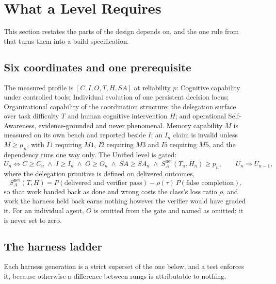 \documentclass[11pt]{article}
\theoremstyle{definition}
\begin{document}
\section{What a Level Requires}\label{sec:requires}

This section restates the parts of \citet{yang2026unified} the design depends on, and the one rule from \citet{yang2026designing} that turns them into a build specification.

\subsection{Six coordinates and one prerequisite}

The measured profile is $[C,I,O,T,H,SA]$ at reliability $p$: Cognitive capability under controlled tools; Individual evolution of one persistent decision locus; Organizational capability of the coordination structure; the delegation surface over task difficulty $T$ and human cognitive intervention $H$; and operational Self-Awareness, evidence-grounded and never phenomenal. Memory capability $M$ is measured on its own bench and reported beside $I$: an $I_n$ claim is invalid unless $M \ge \mu_n$, with $I1$ requiring $M1$, $I2$ requiring $M3$ and $I5$ requiring $M5$, and the dependency runs one way only. The Unified level is gated:
\[
U_n \iff C \ge C_n \;\wedge\; I \ge I_n \;\wedge\; O \ge O_n \;\wedge\; SA \ge SA_n \;\wedge\; S^{\text{net}}_A(T_n,H_n) \ge p_n,
\qquad U_n \Rightarrow U_{n-1},
\]
where the delegation primitive is defined on delivered outcomes,
\[
S^{\text{net}}_A(T,H) = P(\text{delivered and verifier pass}) - \rho(\tau)\,P(\text{false completion}),
\]
so that work handed back as done and wrong costs the class's loss ratio $\rho$, and work the harness held back earns nothing however the verifier would have graded it. For an individual agent, $O$ is omitted from the gate and named as omitted; it is never set to zero.

\subsection{The harness ladder}

Each harness generation is a strict superset of the one below, and a test enforces it, because otherwise a difference between rungs is attributable to nothing.
\end{document}
